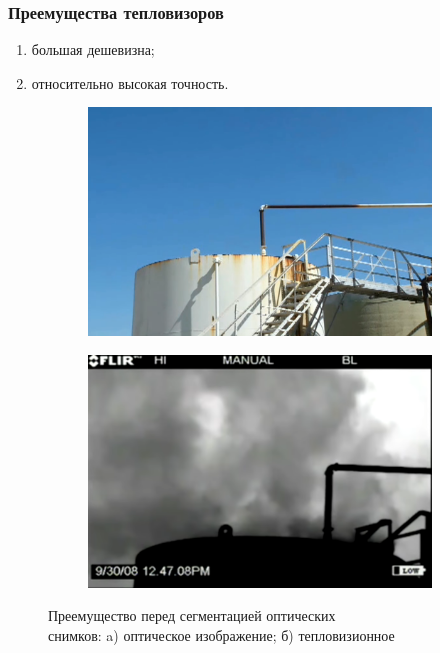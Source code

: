 \documentclass[t]{beamer}
\begin{document}
	\begin{frame}
		\frametitle{Преемущества тепловизоров}
		\begin{enumerate}
			\justifying
			\item большая дешевизна;
			\item относительно высокая точность.
		\end{enumerate}
		\begin{figure}[ht!]
			\begin{subfigure}{.4\textwidth}
				\centering
				\includegraphics[width = \textwidth]{image/optic_invis}
				\caption{}
			\end{subfigure}
			\begin{subfigure}{.4\textwidth}
				\centering
				\includegraphics[width = \textwidth]{image/tep_vis}
				\caption{}
			\end{subfigure}
			\centering
			\caption{Преемущество перед сегментацией оптических\\ снимков: a) оптическое изображение; б) тепловизионное}
			\label{fig:Examples}
		\end{figure}
	\end{frame}
\end{document}
